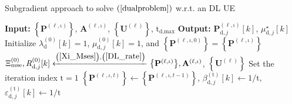 \documentclass[9pt,journal]{IEEEtran}
\newcommand{\paren}[1]{\left({#1}\right)}
\newcommand{\bracket}[1]{{\left [{#1}\right ]}}
\newcommand{\braces}[1]{{\left\{ {#1}\right\}}}
\newcommand{\sfrac}[2]{#1/#2}
\theoremstyle{definition}
\begin{document}
	\begin{algorithm}[ht!]
		\caption{Subgradient approach to solve $\paren{\ref{dualproblem}}$ w.r.t. an DL UE}
		\label{DLalgorithm}
		\begin{algorithmic}[1]
			\Statex \textbf{Input: } $\braces{\mathbf{P}^{\paren{\mathrm{\ell,\iota}}}}$,  $\mathbf{A}^{\paren{\mathrm{\ell,\iota}}}$, $\braces{\mathbf{U}^{\paren{\mathrm{\ell}}}}$, $\mathrm{t}_{\textrm{d,max}}$
			\Statex \textbf{Output:} $\mathbf{P}^{\paren{\mathrm{\ell,\iota}}}_{\textrm{d},j}\bracket{k}$, $\mu^\star_{\textrm{d},j}\bracket{k}$
			\State Initialize $\lambda^{\paren{\mathrm{0}}}_{\textrm{d}}\bracket{k}=1$, $\mu^{\paren{\mathrm{0}}}_{\textrm{d},j}\bracket{k}=1$, and $\braces{\mathbf{P}^{\paren{\ell,\iota,0}}}=\braces{\mathbf{P}^{\paren{\mathrm{\ell,\iota}}}}$ 
			\State $\Xi^{\paren{\mathrm{0}}}_{\textrm{mse}},\mathit{R}^{\paren{\mathrm{0}}}_{\textrm{d},j}\bracket{k}\xleftarrow{\paren{\mathrm{\ref{Xi_Mses}}},\paren{\mathrm{\ref{DL_rate}}}}\braces{\mathbf{P}^{\paren{\mathrm{\ell,\iota}}}},\mathbf{A}^{\paren{\mathrm{\ell,\iota}}}$, $\braces{\mathbf{U}^{\paren{\mathrm{\ell}}}}$
			\State Set the iteration index $\mathrm{t}=1$
			\Repeat
			\State $\braces{\mathbf{P}^{\paren{\ell,\iota,t}}}\leftarrow\braces{\mathbf{P}^{\paren{\ell,\iota,t-1}}}$, $\beta^{\paren{\mathrm{t}}}_{\textrm{d},j}\bracket{k}\leftarrow\sfrac{1}{\mathrm{t}}$, $\varepsilon^{\paren{\mathrm{t}}}_{\textrm{d},j}\bracket{k}\leftarrow\sfrac{1}{\mathrm{t}}$

\end{algorithmic}
\end{algorithm}
\end{document}

